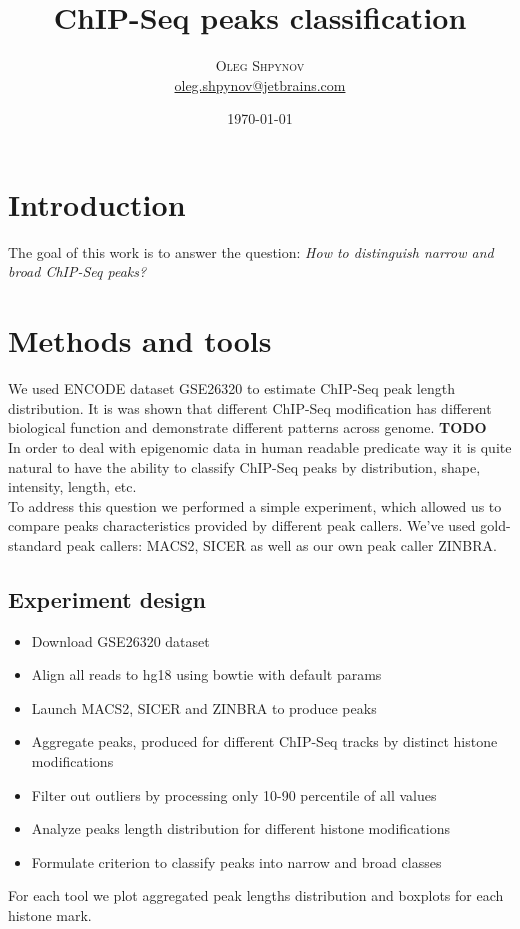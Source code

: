 \documentclass{article}
\title{\vspace{-15mm}\fontsize{24pt}{10pt}\selectfont\textbf{ChIP-Seq peaks classification}} %
\author{
\large
\textsc{Oleg Shpynov}\\
\normalsize \href{mailto:oleg.shpynov@jetbrains.com}{oleg.shpynov@jetbrains.com} %
\vspace{-1mm}
}
\date{\today}
\begin{document}
\maketitle %
\tableofcontents %


\section{Introduction}
The goal of this work is to answer the question:
\textit{How to distinguish narrow and broad ChIP-Seq peaks?}

\section{Methods and tools}
We used ENCODE dataset GSE26320 to estimate ChIP-Seq peak length distribution. It is was shown that different ChIP-Seq modification has different biological function and demonstrate different patterns across genome. \textbf{TODO}\\
In order to deal with epigenomic data in human readable predicate way it is quite natural to have the ability to classify ChIP-Seq peaks by distribution, shape, intensity, length, etc.\\
To address this question we performed a simple experiment, which allowed us to compare peaks characteristics provided by different peak callers. We've used gold-standard peak callers: MACS2, SICER as well as our own peak caller ZINBRA.\\

\subsection{Experiment design}
\begin{itemize}
\item Download GSE26320 dataset
\item Align all reads to hg18 using bowtie with default params
\item Launch MACS2, SICER and ZINBRA to produce peaks
\item Aggregate peaks, produced for different ChIP-Seq tracks by distinct histone modifications
\item Filter out outliers by processing only 10-90 percentile of all values
\item Analyze peaks length distribution for different histone modifications 
\item Formulate criterion to classify peaks into narrow and broad classes
\end{itemize}
For each tool we plot aggregated peak lengths distribution and boxplots for each histone mark.
\end{document}

